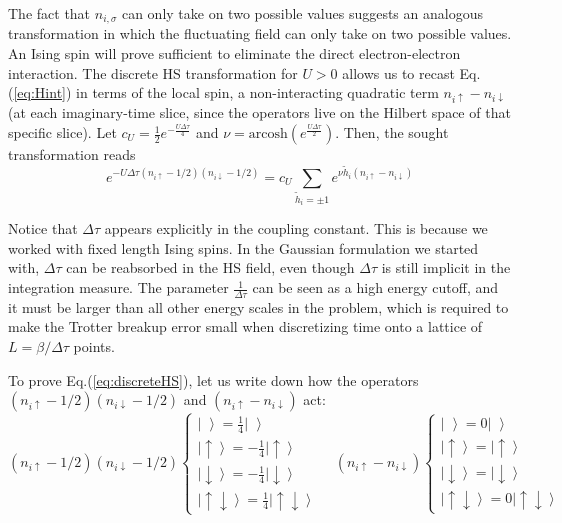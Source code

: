 The fact that $n_{i,\sigma}$ can only take on two possible values suggests an analogous transformation in which the fluctuating field can only take on two possible values.
An Ising spin will prove sufficient to eliminate the direct electron-electron interaction.
The discrete HS transformation for $U > 0$ allows us to recast Eq.(\ref{eq:Hint}) in terms of the local spin, a non-interacting quadratic term $n_{i\uparrow} - n_{i\downarrow} $ (at each imaginary-time slice, since the operators live on the Hilbert space of that specific slice).
Let $c_U = \frac{1}{2} e^{-\frac{U\Delta \tau}{4}}$ and $\nu = \text{arcosh} ( e^{\frac{U\Delta\tau}{2}})$.
Then, the sought transformation reads
\begin{equation}\label{eq:discreteHS}
e^{-U \Delta\tau (n_{i\uparrow} - 1/2 ) (n_{i\downarrow} - 1/2 )} = c_U \sum_{\widetilde{h}_i = \pm 1} e^{\nu \widetilde{h}_i (n_{i\uparrow} - n_{i\downarrow} )}
\end{equation}

Notice that $\Delta \tau$ appears explicitly in the coupling constant.
This is because we worked with fixed length Ising spins.
In the Gaussian formulation we started with, $\Delta \tau$ can be reabsorbed in the HS field, even though $\Delta \tau$ is still implicit in the integration measure.
The parameter $\frac{1}{\Delta \tau}$ can be seen as a high energy cutoff, and it must be larger than all other energy scales in the problem, which is required to make the Trotter breakup error small when discretizing time onto a lattice of $L = \beta / \Delta \tau$ points.

To prove Eq.(\ref{eq:discreteHS}), let us write down how the operators  $(n_{i\uparrow} - 1/2 ) (n_{i\downarrow} - 1/2 )$ and $(n_{i\uparrow} - n_{i\downarrow} )$ act:
\begin{equation}
(n_{i\uparrow} - 1/2 ) (n_{i\downarrow} - 1/2 )
\begin{cases}
\left| \, \, \right\rangle = \frac{1}{4} \left| \, \, \right\rangle \\
\left| \uparrow \right\rangle = -\frac{1}{4} \left| \uparrow \right\rangle \\
\left| \downarrow \right\rangle = -\frac{1}{4} \left| \downarrow \right\rangle \\
\left| \uparrow \downarrow \right\rangle = \frac{1}{4} \left| \uparrow \downarrow \right\rangle
\end{cases} \quad
(n_{i\uparrow} - n_{i\downarrow} )
\begin{cases}
\left| \, \, \right\rangle = 0\left| \, \, \right\rangle \\
\left| \uparrow \right\rangle = \left| \uparrow \right\rangle \\
\left| \downarrow \right\rangle = \left| \downarrow \right\rangle \\
\left| \uparrow \downarrow \right\rangle = 0 \left| \uparrow \downarrow \right\rangle
\end{cases}
\end{equation}

